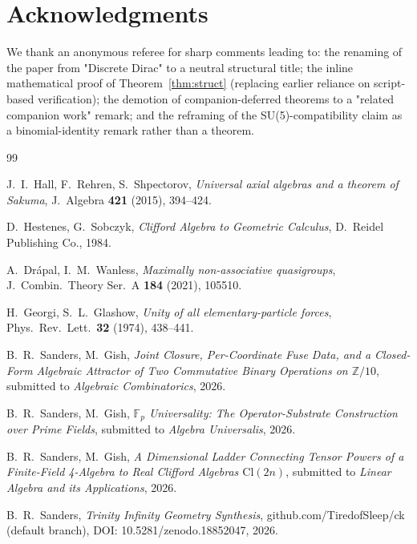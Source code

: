 \documentclass[11pt,reqno]{amsart}
\theoremstyle{plain}
\theoremstyle{definition}
\theoremstyle{remark}
\newcommand{\Z}{\mathbb{Z}}
\newcommand{\F}{\mathbb{F}}
\newcommand{\Cl}{\mathrm{Cl}}
\begin{document}
\section*{Acknowledgments}

We thank an anonymous referee for sharp comments leading to: the renaming of the paper from "Discrete Dirac" to a neutral structural title; the inline mathematical proof of Theorem~\ref{thm:struct} (replacing earlier reliance on script-based verification); the demotion of companion-deferred theorems to a "related companion work" remark; and the reframing of the SU(5)-compatibility claim as a binomial-identity remark rather than a theorem.

\begin{thebibliography}{99}

 J.~I.~Hall, F.~Rehren, S.~Shpectorov,
\emph{Universal axial algebras and a theorem of Sakuma},
J.~Algebra \textbf{421} (2015), 394--424.

 D.~Hestenes, G.~Sobczyk,
\emph{Clifford Algebra to Geometric Calculus},
D.~Reidel Publishing Co., 1984.

 A.~Drápal, I.~M.~Wanless,
\emph{Maximally non-associative quasigroups},
J.~Combin.~Theory Ser.~A \textbf{184} (2021), 105510.

 H.~Georgi, S.~L.~Glashow,
\emph{Unity of all elementary-particle forces},
Phys.~Rev.~Lett.~\textbf{32} (1974), 438--441.

 B.~R.~Sanders, M.~Gish,
\emph{Joint Closure, Per-Coordinate Fuse Data, and a Closed-Form
Algebraic Attractor of Two Commutative Binary Operations on
$\Z/10$}, submitted to \emph{Algebraic Combinatorics}, 2026.

 B.~R.~Sanders, M.~Gish,
\emph{$\F_p$ Universality: The Operator-Substrate Construction over
Prime Fields}, submitted to \emph{Algebra Universalis}, 2026.

 B.~R.~Sanders, M.~Gish,
\emph{A Dimensional Ladder Connecting Tensor Powers of a Finite-Field
4-Algebra to Real Clifford Algebras $\Cl(2n)$},
submitted to \emph{Linear Algebra and its Applications}, 2026.

 B.~R.~Sanders,
\emph{Trinity Infinity Geometry Synthesis},
github.com/TiredofSleep/ck (default branch),
DOI: 10.5281/zenodo.18852047, 2026.

\end{thebibliography}
\end{document}
